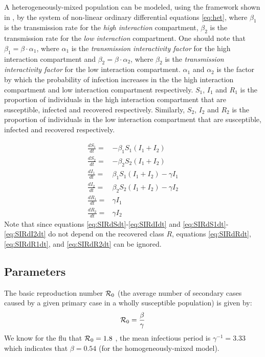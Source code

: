 \documentclass[a4paper, 12pt, journal]{ieeeconf}\usepackage[]{graphicx}\usepackage[]{color}
\begin{document}
A heterogeneously-mixed population can be modeled, using the framework shown in , by the system of non-linear ordinary differential equations \eqref{eq:het}, where $\beta_1$ is the transmission rate for the \emph{high interaction} compartment, $\beta_2$ is the transmission rate for the \emph{low interaction} compartment. One should note that $\beta_1 = \beta\cdot\alpha_1$, where $\alpha_1$ is the \textit{transmission interactivity factor} for the high interaction compartment and $\beta_2 = \beta\cdot\alpha_2$, where $\beta_2$ is the \textit{transmission interactivity factor} for the low interaction compartment. $\alpha_1$ and $\alpha_2$ is the factor by which the probability of infection increases in the the high interaction compartment and low interaction compartment respectively. $S_1$, $I_1$ and $R_1$ is the proportion of individuals in the high interaction compartment that are susceptible, infected and recovered respectively. Similarly, $S_2$, $I_2$ and $R_2$ is the proportion of individuals in the low interaction compartment that are susceptible, infected and recovered respectively.

\begin{subequations}\label{eq:het}
\begin{eqnarray}
\frac{dS_1}{dt} =& -\beta_1 S_1 (I_1 + I_2) \label{eq:SIRdS1dt}\\
\frac{dS_2}{dt} =& -\beta_2 S_2 (I_1 + I_2)\label{eq:SIRdS2dt}\\
\frac{dI_1}{dt} =& \beta_1 S_1 (I_1 + I_2) - \gamma I_1\label{eq:SIRdI1dt}\\
\frac{dI_2}{dt} =& \beta_2 S_2 (I_1 + I_2) - \gamma I_2 \label{eq:SIRdI2dt}\\
\frac{dR_1}{dt} =& \gamma I_1 \label{eq:SIR_het_dr} \label{eq:SIRdR1dt}\\
\frac{dR_2}{dt} =& \gamma I_2 \label{eq:SIRdR2dt}
\end{eqnarray}
\end{subequations}
Note that since equations \eqref{eq:SIRdSdt}-\eqref{eq:SIRdIdt} and \eqref{eq:SIRdS1dt}-\eqref{eq:SIRdI2dt} do not depend on the recovered class $R$, equations \eqref{eq:SIRdRdt}, \eqref{eq:SIRdR1dt}, and \eqref{eq:SIRdR2dt} can be ignored.

\subsection{Parameters}

The basic reproduction number $\R_0$ (the average number of secondary cases caused by a given primary case in a wholly susceptible population) is given by:
\begin{equation}\label{eq:Ro}
\R_0=\frac{\beta}{\gamma}
\end{equation}
We know for the flu that $\R_0 = 1.8$ \cite{reproductiveno.influenza}, the mean infectious period is $\gamma^{-1} = 3.33$ \cite{reproductiveno.influenza} which indicates that 
$\beta = 0.54$ (for the homogeneously-mixed model).
\end{document}
